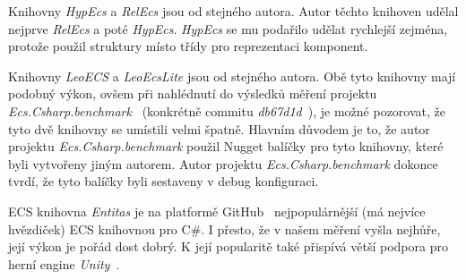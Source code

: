Knihovny \textit{HypEcs} a \textit{RelEcs} jsou od stejného autora. Autor těchto knihoven udělal nejprve \textit{RelEcs} a poté \textit{HypEcs}. \textit{HypEcs} se mu podařilo udělat rychlejší zejména, protože použil struktury místo třídy pro reprezentaci komponent.

Knihovny \textit{LeoECS} a \textit{LeoEcsLite} jsou od stejného autora. Obě tyto knihovny mají podobný výkon, ovšem při nahlédnutí do výsledků měření projektu \textit{Ecs.Csharp.benchmark}~\cite{EcsCsharpBenchmark} (konkrétně commitu \textit{db67d1d}~\cite{EcsCsharpBenchmarkCommit}), je možné pozorovat, že tyto dvě knihovny se umístili velmi špatně. Hlavním důvodem je to, že autor projektu \textit{Ecs.Csharp.benchmark} použil Nugget balíčky pro tyto knihovny, které byli vytvořeny jiným autorem. Autor projektu \textit{Ecs.Csharp.benchmark} dokonce tvrdí, že tyto balíčky byli sestaveny v debug konfiguraci.

ECS knihovna \textit{Entitas} je na platformě GitHub~\cite{GitHub} nejpopulárnější (má nejvíce hvězdiček) ECS knihovnou pro C\#. I přesto, že v našem měření vyšla nejhůře, její výkon je pořád dost dobrý. K její popularitě také přispívá větší podpora pro herní engine \textit{Unity}~\cite{Unity}.